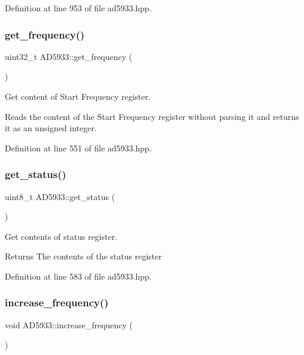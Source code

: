 Definition at line 953 of file ad5933.\+hpp.

\mbox{\label{struct_a_d5933_aa9d0a7684997e6b7f662f1ad5acc2074}} 
\subsubsection{\texorpdfstring{get\+\_\+frequency()}{get\_frequency()}}
{\footnotesize\ttfamily uint32\+\_\+t A\+D5933\+::get\+\_\+frequency (\begin{DoxyParamCaption}{ }\end{DoxyParamCaption})}



Get content of Start Frequency register. 

Reads the content of the Start Frequency register without parsing it and returns it as an unsigned integer. 

Definition at line 551 of file ad5933.\+hpp.

\mbox{\label{struct_a_d5933_aa2c2053a63395fc76be01a00b91e1bec}} 
\subsubsection{\texorpdfstring{get\+\_\+status()}{get\_status()}}
{\footnotesize\ttfamily uint8\+\_\+t A\+D5933\+::get\+\_\+status (\begin{DoxyParamCaption}{ }\end{DoxyParamCaption})}



Get contents of status register. 

\begin{DoxyReturn}{Returns}
The contents of the status register 
\end{DoxyReturn}


Definition at line 583 of file ad5933.\+hpp.

\mbox{\label{struct_a_d5933_ab0d13523bbb22eae6366815077540958}} 
\subsubsection{\texorpdfstring{increase\+\_\+frequency()}{increase\_frequency()}}
{\footnotesize\ttfamily void A\+D5933\+::increase\+\_\+frequency (\begin{DoxyParamCaption}{ }\end{DoxyParamCaption})}



